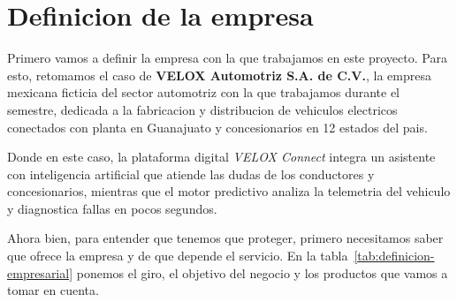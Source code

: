 \documentclass[letterpaper,11pt]{article}
\begin{document}
\hypersetup{pageanchor=false}


\newpage
{\hypersetup{linkcolor=black}\tableofcontents}

\newpage
\setcounter{page}{1}
\hypersetup{pageanchor=true}
\singlespacing

\section{Definicion de la empresa}

Primero vamos a definir la empresa con la que trabajamos en este
proyecto. Para esto, retomamos el caso de \textbf{VELOX Automotriz
S.A. de C.V.}, la empresa mexicana ficticia del sector automotriz
con la que trabajamos durante el semestre, dedicada a la fabricacion
y distribucion de vehiculos electricos conectados con planta en
Guanajuato y concesionarios en 12 estados del pais.

Donde en este caso, la plataforma digital \textit{VELOX Connect}
integra un asistente con inteligencia artificial que atiende las
dudas de los conductores y concesionarios, mientras que el motor
predictivo analiza la telemetria del vehiculo y diagnostica fallas
en pocos segundos.

Ahora bien, para entender que tenemos que proteger, primero
necesitamos saber que ofrece la empresa y de que depende el
servicio. En la tabla~\ref{tab:definicion-empresarial} ponemos el
giro, el objetivo del negocio y los productos que vamos a tomar en
cuenta.
\end{document}
